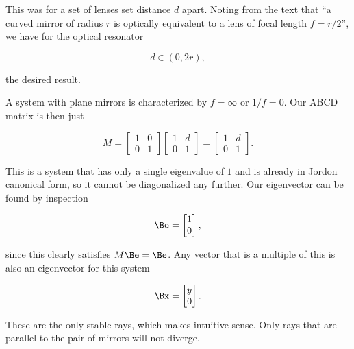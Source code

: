 {This was for a set of lenses set distance $d$ apart.  Noting from the text that ``a curved mirror of radius $r$ is optically equivalent to a lens of focal length $f = r/2$'', we have for the optical resonator

\begin{dmath}\label{eqn:problemSet4Problem2:1140}
\boxed{
d \in (0, 2 r),
}
\end{dmath}

the desired result.


A system with plane mirrors is characterized by $f = \infty$ or $1/f = 0$.  Our ABCD matrix is then just

\begin{equation}\label{eqn:problemSet4Problem2:1160}
M = 
\begin{bmatrix}
1 & 0 \\
0 & 1
\end{bmatrix}
\begin{bmatrix}
1 & d \\
0 & 1
\end{bmatrix}
=
\begin{bmatrix}
1 & d \\
0 & 1
\end{bmatrix}.
\end{equation}

This is a system that has only a single eigenvalue of $1$ and is already in Jordon canonical form, so it cannot be diagonalized any further.  Our eigenvector can be found by inspection

\begin{dmath}\label{eqn:problemSet4Problem2:640}
\Be = 
\begin{bmatrix}
1 \\
0 
\end{bmatrix},
\end{dmath}

since this clearly satisfies $M \Be = \Be$.  Any vector that is a multiple of this is also an eigenvector for this system

\begin{dmath}\label{eqn:problemSet4Problem2:660}
\Bx = 
\begin{bmatrix}
y \\ 
0
\end{bmatrix}.
\end{dmath}

These are the only stable rays, which makes intuitive sense.  Only rays that are parallel to the pair of mirrors will not diverge.

}
